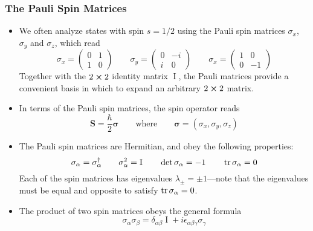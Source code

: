 \documentclass[11pt, a4paper]{article}
\newcommand{\eqtext}[1]{\qquad \text{#1} \qquad}
\renewcommand{\vec}[1]{\bm{#1}}  %
\renewcommand{\S}{\vec{S}}  %
\newcommand{\II}{\operatorname{I}}  %
\begin{document}
\subsubsection{The Pauli Spin Matrices}
\begin{itemize}
	\item We often analyze states with spin $ s = 1/2 $ using the Pauli spin matrices $ \sigma_{x} $, $ \sigma_{y} $ and $ \sigma_{z} $, which read
	\begin{equation*}
		\sigma_{x} = 
		\begin{pmatrix}
			0 & 1\\
			1 & 0
		\end{pmatrix} \qquad 
		\sigma_{y} = 
		\begin{pmatrix}
			0 & -i\\
			i & 0
		\end{pmatrix} \qquad 
		\sigma_{x} = 
		\begin{pmatrix}
			1 & 0\\
			0 & -1
		\end{pmatrix}
	\end{equation*}
	Together with the $ 2 \cross 2 $ identity matrix $ \II $, the Pauli matrices provide a convenient basis in which to expand an arbitrary $ 2 \cross 2 $ matrix. 
	
	\item In terms of the Pauli spin matrices, the spin operator reads
	\begin{equation*}
		\S = \frac{\hbar}{2}\vec{\sigma} \eqtext{where} \vec{\sigma} = (\sigma_{x}, \sigma_{y}, \sigma_{z})
	\end{equation*}

	\item The Pauli spin matrices are Hermitian, and obey the following properties:
	\begin{equation*}
		\sigma_{\alpha} = \sigma_{\alpha}^{\dagger} \qquad \sigma_{\alpha}^{2} = \II \qquad \det \sigma_{\alpha} = -1 \qquad \tr \sigma_{\alpha} = 0
	\end{equation*}
	Each of the spin matrices has eigenvalues $ \lambda_{\pm} = \pm 1 $---note that the eigenvalues must be equal and opposite to satisfy $ \tr \sigma_{\alpha} = 0 $.
	
	\item The product of two spin matrices obeys the general formula
	\begin{equation*}
		\sigma_{\alpha}\sigma_{\beta} = \delta_{\alpha \beta} \II + i \epsilon_{\alpha \beta \gamma}\sigma_{\gamma}
	\end{equation*}
	

\end{itemize}
\end{document}
